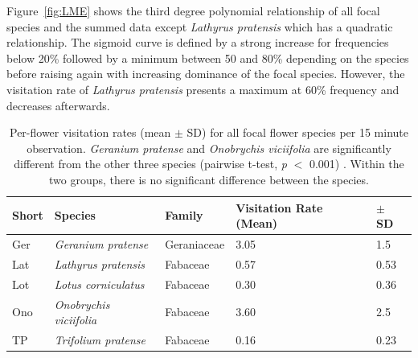Figure~\ref{fig:LME} shows the third degree polynomial relationship of all focal species and the summed data except \textit{Lathyrus pratensis} which has a quadratic relationship. The sigmoid curve is defined by a strong increase for frequencies below 20\% followed by a minimum between 50 and 80\% depending on the species before raising again with increasing dominance of the focal species. However, the visitation rate of \textit{Lathyrus pratensis} presents a maximum at 60\% frequency and decreases afterwards. 



\begin{table}[htbp] %
	\centering
	\caption{Per-flower visitation rates (mean $\pm$ SD) for all focal flower species per 15 minute observation. \textit{Geranium pratense} and \textit{Onobrychis viciifolia} are significantly different from the other three species (pairwise t-test, \textit{p} $<$ 0.001) . Within the two groups, there is no significant difference between the species. }
	\begin{tabular}{l l l l l}
		\toprule
		\textbf {Short} & \textbf{Species} & \textbf{Family} &\textbf{Visitation Rate (Mean)} & \textbf{ $\pm$ SD} \\
		\midrule
		Ger  & \textit{Geranium pratense} & Geraniaceae & 3.05 & 1.5 \\ %
		Lat  & \textit{Lathyrus pratensis} & Fabaceae & 0.57 & 0.53 \\ %
		Lot  & \textit{Lotus corniculatus} & Fabaceae & 0.30 & 0.36 \\  %
		Ono  & \textit{Onobrychis viciifolia} & Fabaceae & 3.60  &  2.5 \\ %
		TP   & \textit{Trifolium pratense} & Fabaceae & 0.16 & 0.23 \\ %
		\bottomrule
	\end{tabular}%
	\label{tab:VR_spec}
\end{table}%



